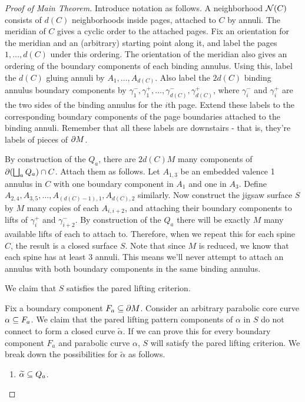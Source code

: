 \begin{proof}[Proof of Main Theorem]
Introduce notation as follows. A neighborhood $\mathcal{N}(C)$ consists of $d(C)$
neighborhoods inside pages, attached to $C$ by annuli. The meridian of $C$
gives a cyclic order to the attached pages.  Fix an orientation for the
meridian and an (arbitrary) starting point along it, and label the pages $1,
\dots, d(C)$ under this ordering.  The orientation of the meridian also gives
an ordering of the boundary components of each binding  annulus.  Using this,
label the $d(C)$ gluing annuli by $A_1,\dots,A_{d(C)}$. Also label the $2d(C)$
binding annulus boundary components by $\gamma_1^-,\gamma_1^+,\dots,
\gamma_{d(C)}^-,\gamma_{d(C)}^+$, where $\gamma_i^-$ and $\gamma_i^+$ are the
two sides of the binding annulus for the $i$th page.  Extend these labels to
the corresponding boundary components of the page boundaries attached to the
binding annuli.  Remember that all these labels are downstairs - that is,
they're labels of pieces of $\partial M$.

By construction of the $Q_a$, there are $2d(C)M$ many components of
$\partial(\bigsqcup_a Q_a) \cap C$. Attach them as follows. Let $A_{1,3}$ be an
embedded valence 1 annulus in $C$ with one boundary component in $A_1$ and one
in $A_3$. Define $A_{2,4},A_{3,5},\dots,A_{(d(C)-1),1},A_{d(C),2}$ similarly.
Now construct the jigsaw surface $S$ by $M$ many copies of each $A_{i,i+2}$,
and attaching their boundary components to lifts of $\gamma_i^+$ and
$\gamma_{i+2}^-$. By construction of the $Q_a$ there will be exactly $M$ many
available lifts of each to attach to. Therefore, when we repeat this for each
spine $C$, the result is a closed surface $S$. Note that since $M$ is reduced,
we know that each spine has at least 3 annuli. This means we'll never attempt
to attach an annulus with both boundary components in the same binding annulus.

We claim that $S$ satisfies the pared lifting criterion.

Fix a boundary component $F_a \subseteq \partial M$. Consider an arbitrary parabolic core
curve $\alpha \subseteq F_a$. We claim that the pared lifting pattern components of
$\alpha$ in $S$ do not connect to form a closed curve $\widetilde{\alpha}$.  If
we can prove this for every boundary component $F_a$ and parabolic curve
$\alpha$, $S$ will satisfy the pared lifting criterion.  We break down the
possibilities for $\widetilde{\alpha}$ as follows.

\begin{enumerate}

\item $\widetilde{\alpha} \subseteq Q_a$.


\end{enumerate}
\end{proof}
